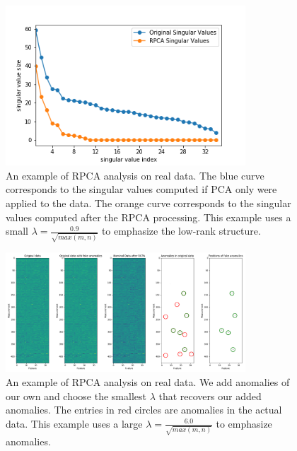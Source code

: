 \documentclass[conference]{IEEEtran}
\begin{document}
\begin{figure}
    \centering
    \includegraphics[width=0.8\textwidth]{images/new_7-26-2020/real_data_svd.png}
    \caption{An example of RPCA analysis on real data.  The blue curve corresponds to the singular values computed if PCA only were applied to the data.  The orange curve corresponds to the singular values computed after the RPCA processing.  This example uses a small $\lambda=\frac{0.9}{\sqrt{max(m,n)}}$ to emphasize the low-rank structure. }
    \label{fig:real_data_rank}
\end{figure}

\begin{figure}
    \centering
    \includegraphics[width=0.8\textwidth]{images/new_7-26-2020/real_data.png}
    \caption{An example of RPCA analysis on real data.   We add anomalies of our own and choose the smallest $\lambda$ that recovers our added anomalies.  The entries in red circles are anomalies in the actual data. This example uses a large $\lambda=\frac{6.0}{\sqrt{max(m,n)}}$ to emphasize anomalies. }
    \label{fig:real_data_anomalie}
\end{figure}

\end{document}
